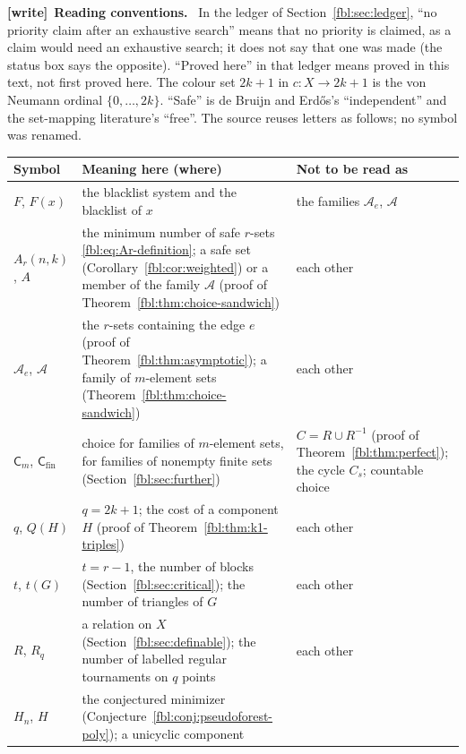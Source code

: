 \documentclass[11pt]{article}
\theoremstyle{definition}
\theoremstyle{remark}
\newcommand{\cA}{\mathcal A}
\newcommand{\Cm}{\mathsf{C}}
\newenvironment{writenote}[1][]{\par\smallskip\begingroup\small
 \noindent\textbf{[write]}\if\relax\detokenize{#1}\relax\else~\textbf{#1.}\fi\ }%
 {\par\endgroup\smallskip}
\renewcommand{\arraystretch}{1.16}
\begin{document}
\begin{writenote}[Reading conventions]
In the ledger of Section~\ref{fbl:sec:ledger}, ``no priority claim after an
exhaustive search'' means that no priority is claimed, as a claim would need
an exhaustive search; it does not say that one was made (the status box says
the opposite). ``Proved here'' in that ledger means proved in this text, not
first proved here. The colour set $2k+1$ in $c:X\to2k+1$ is the von Neumann
ordinal $\{0,\dots,2k\}$. ``Safe'' is de Bruijn and Erd\H{o}s's
``independent'' and the set-mapping literature's ``free''. The source reuses
letters as follows; no symbol was renamed.
\end{writenote}
\begin{center}\small
\renewcommand{\arraystretch}{1.12}
\begin{tabularx}{\textwidth}{@{}>{\raggedright\arraybackslash}p{}>{\raggedright\arraybackslash}X>{\raggedright\arraybackslash}p{}@{}}
\toprule
Symbol & Meaning here (where) & Not to be read as\\
\midrule
$F$, $F(x)$ & the blacklist system and the blacklist of $x$ & the families
 $\cA_e$, $\cA$\\
$A_r(n,k)$, $A$ & the minimum number of safe $r$-sets
 \eqref{fbl:eq:Ar-definition}; a safe set (Corollary~\ref{fbl:cor:weighted})
 or a member of the family $\cA$ (proof of
 Theorem~\ref{fbl:thm:choice-sandwich}) & each other\\
$\cA_e$, $\cA$ & the $r$-sets containing the edge $e$ (proof of
 Theorem~\ref{fbl:thm:asymptotic}); a family of $m$-element sets
 (Theorem~\ref{fbl:thm:choice-sandwich}) & each other\\
$\Cm_m$, $\Cm_{\mathrm{fin}}$ & choice for families of $m$-element sets,
 for families of nonempty finite sets (Section~\ref{fbl:sec:further}) &
 $C=R\cup R^{-1}$ (proof of Theorem~\ref{fbl:thm:perfect}); the cycle
 $C_s$; countable choice\\
$q$, $Q(H)$ & $q=2k+1$; the cost of a component $H$ (proof of
 Theorem~\ref{fbl:thm:k1-triples}) & each other\\
$t$, $t(G)$ & $t=r-1$, the number of blocks (Section~\ref{fbl:sec:critical});
 the number of triangles of $G$ & each other\\
$R$, $R_q$ & a relation on $X$ (Section~\ref{fbl:sec:definable}); the
 number of labelled regular tournaments on $q$ points & each other\\
$H_n$, $H$ & the conjectured minimizer
 (Conjecture~\ref{fbl:conj:pseudoforest-poly}); a unicyclic component &

\end{tabularx}
\end{center}
\end{document}
